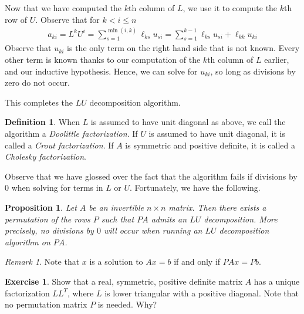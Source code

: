 \documentclass[12pt]{article}
\theoremstyle{plain}
\newtheorem{proposition}[theorem]{Proposition}
\theoremstyle{definition}
\newtheorem*{definition}{Definition}
\newtheorem*{exercise}{Exercise}
\theoremstyle{remark}
\newtheorem*{remark}{Remark}
\numberwithin{equation}{section}  %
\begin{document}
Now that we have computed the $k$th column of $L$, we use it
to compute the $k$th row of $U$. Observe that for $k < i \le n$
\begin{align*}
a_{ki} = L^k U^i = \sum_{s=1}^{\min(i,k)}\ell_{ks}u_{si}
= \sum_{s=1}^{k-1} \ell_{ks} u_{si} + \ell_{kk} u_{ki}
\end{align*}
Observe that $u_{ki}$ is the only term on the right hand side
that is not known. Every other term is known thanks to our computation
of the $k$th column of $L$ earlier, and our inductive hypothesis. Hence,
we can solve for $u_{ki}$, so long as divisions by zero do not occur.

This completes the $LU$ decomposition algorithm. 

\begin{definition}
When $L$ is assumed to have unit diagonal
as above, we call the algorithm a \emph{Doolittle factorization}. 
If $U$ is assumed to have unit diagonal, it is called a \emph{Crout
factorization}. If $A$ is symmetric and positive definite, it is called a
\emph{Cholesky factorization}.
\end{definition}
Observe that we have glossed over the fact that the algorithm fails
if divisions by $0$ when solving for terms in $L$ or $U$. Fortunately,
we have the following.
\begin{proposition}
Let $A$ be an invertible $n \times n$ matrix. Then there exists
a permutation of the rows $P$ such that $PA$ admits 
an $LU$ decomposition. More precisely, no divisions by $0$ will
occur when running an $LU$ decomposition algorithm on $PA$.
\end{proposition}
\begin{remark}
Note that $x$ is a solution to $Ax = b$ if and only if $PAx = Pb$.
\end{remark}
\begin{exercise}
Show that a real, symmetric, positive definite matrix $A$ has a unique
factorization $L L^T$, where $L$ is lower triangular
with a positive diagonal. Note that no permutation matrix $P$ is needed. Why?
\end{exercise}
\end{document}
